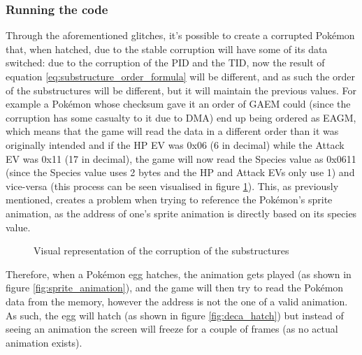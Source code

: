 \documentclass[a4paper]{usiinfbachelorproject}
\begin{document}
\subsubsection{Running the code}
\label{sec:running_the_code}
Through the aforementioned glitches, it's possible to create a corrupted Pokémon that, when hatched, due to the stable corruption will have some of its data switched: due to the corruption of the PID and the TID, now the result of equation \ref{eq:substructure_order_formula} will be different, and as such the order of the substructures will be different, but it will maintain the previous values. For example a Pokémon whose checksum gave it an order of GAEM could (since the corruption has some casualty to it due to DMA) end up being ordered as EAGM, which means that the game will read the data in a different order than it was originally intended and if the HP EV was 0x06 (6 in decimal) while the Attack EV was 0x11 (17 in decimal), the game will now read the Species value as 0x0611 (since the Species value uses 2 bytes and the HP and Attack EVs only use 1) and vice-versa (this process can be seen visualised in figure \ref{fig:corruption_substructures}). This, as previously mentioned, creates a problem when trying to reference the Pokémon's sprite animation, as the address of one's sprite animation is directly based on its species value.

\begin{figure}[h!]
	\caption{Visual representation of the corruption of the substructures}
	\label{fig:corruption_substructures}
\end{figure}


Therefore, when a Pokémon egg hatches, the animation gets played (as shown in figure \ref{fig:sprite_animation}), and the game will then try to read the Pokémon data from the memory, however the address is not the one of a valid animation. As such, the egg will hatch (as shown in figure \ref{fig:deca_hatch}) but instead of seeing an animation the screen will freeze for a couple of frames (as no actual animation exists).
\end{document}
